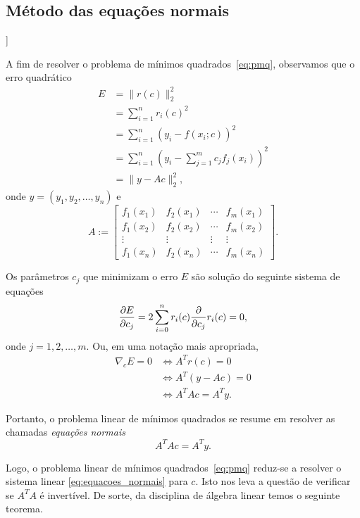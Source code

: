 \subsection{Método das equações normais}

\begin{flushleft}
  [[tag:revisar]]
\end{flushleft}

A fim de resolver o problema de mínimos quadrados~\eqref{eq:pmq}, observamos que o erro quadrático
\begin{align}
  E &= \|r(c)\|_2^2 \\
    &= \sum_{i=1}^n r_i(c)^2 \\
    &= \sum_{i=1}^n \left(y_i - f(x_i;c)\right)^2 \\
    &= \sum_{i=1}^n \left(y_i - \sum_{j=1}^m c_jf_j(x_i)\right)^2 \\
    &= \|y - Ac\|_2^2,
\end{align}
onde $y = (y_1, y_2, \dotsc, y_n)$ e
\begin{equation}
  A :=
  \begin{bmatrix}
    f_1(x_1) & f_2(x_1) & \cdots & f_m(x_1) \\
    f_1(x_2) & f_2(x_2) & \cdots & f_m(x_2) \\
    \vdots & \vdots & \vdots & \vdots \\
    f_1(x_n) & f_2(x_n) & \cdots & f_m(x_n)
  \end{bmatrix}.
\end{equation}

Os parâmetros $c_j$ que minimizam o erro $E$ são solução do seguinte sistema de equações
\begin{equation}
  \frac{\partial E}{\partial c_j} = 2\sum_{i=0}^n r_i(c)\frac{\partial}{\partial c_j}r_i(c) = 0,
\end{equation}
onde $j=1, 2, \dotsc, m$. Ou, em uma notação mais apropriada,
\begin{align}
  \nabla_c E = 0 &\Leftrightarrow A^Tr(c) = 0\\
  &\Leftrightarrow A^T(y - Ac) = 0\\
  &\Leftrightarrow A^TAc = A^Ty.
\end{align}

Portanto, o problema linear de mínimos quadrados se resume em resolver as chamadas \emph{equações normais}
\begin{equation}\label{eq:equacoes_normais}
  A^TAc= A^Ty.
\end{equation}

Logo, o problema linear de mínimos quadrados~\eqref{eq:pmq} reduz-se a resolver o sistema linear \eqref{eq:equacoes_normais} para $c$. Isto nos leva a questão de verificar se $A^TA$ é invertível. De sorte, da disciplina de álgebra linear temos o seguinte teorema.

